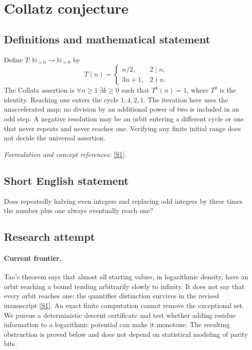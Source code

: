 \documentclass[11pt,a4paper]{article}
\newcommand{\N}{\mathbb{N}}
\newcommand{\sref}[2]{\hyperlink{source:#1:#2}{[S#2]}}
\newif\ifshowcatalogue
\newcommand{\cataloguescope}[1]{\ifshowcatalogue
 \paragraph{Exact scope in the supplied catalogue.}
 \begin{quote}\small #1\end{quote}\fi}
\numberwithin{equation}{section}
\begin{document}
\setcounter{section}{187}
\clearpage
\section{\texorpdfstring{Collatz conjecture}{Collatz conjecture}}\label{188}
\subsection{Definitions and mathematical statement}
Define $T:\N_{>0}\to\N_{>0}$ by
\[
 T(n)=\begin{cases}n/2,&2\mid n,\\3n+1,&2\nmid n.\end{cases}
\]
The Collatz assertion is $\forall n\ge1\ \exists k\ge0$ such that $T^k(n)=1$, where $T^0$ is the identity. Reaching one enters the cycle $1,4,2,1$. The iteration here uses the unaccelerated map; no division by an additional power of two is included in an odd step. A negative resolution may be an orbit entering a different cycle or one that never repeats and never reaches one. Verifying any finite initial range does not decide the universal assertion.
\par\smallskip\textit{Formulation and concept references:} \sref{188}{1}.
\cataloguescope{Prove or disprove that, for every positive integer N, repeated application of N -> N/2 when N is even and N -> 3N+1 when N is odd eventually reaches 1.}
\subsection{Short English statement}
Does repeatedly halving even integers and replacing odd integers by three times the number plus one always eventually reach one?
\subsection{Research attempt}

\paragraph{Current frontier.}
Tao's theorem says that almost all starting values, in logarithmic density, have an orbit reaching a bound tending arbitrarily slowly to infinity. It does not say that every orbit reaches one; the quantifier distinction survives in the revised manuscript \sref{188}{1}. An exact finite computation cannot remove the exceptional set. We pursue a deterministic descent certificate and test whether adding residue information to a logarithmic potential can make it monotone. The resulting obstruction is proved below and does not depend on statistical modeling of parity bits.
\end{document}

